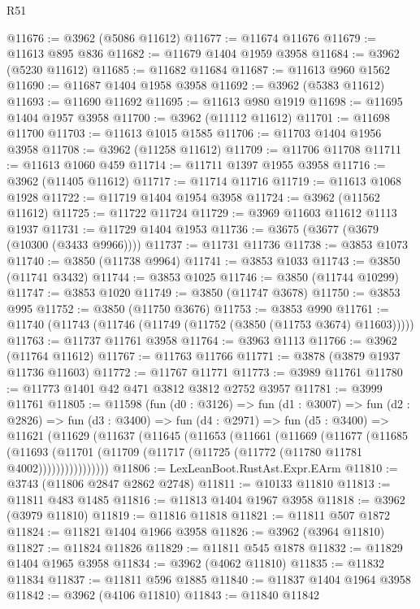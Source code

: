 \begin{lexlean}{R51}
\begin{coremodule}
@11676 := @3962 (@5086 @11612)
@11677 := @11674 @11676
@11679 := @11613 @895 @836
@11682 := @11679 @1404 @1959 @3958
@11684 := @3962 (@5230 @11612)
@11685 := @11682 @11684
@11687 := @11613 @960 @1562
@11690 := @11687 @1404 @1958 @3958
@11692 := @3962 (@5383 @11612)
@11693 := @11690 @11692
@11695 := @11613 @980 @1919
@11698 := @11695 @1404 @1957 @3958
@11700 := @3962 (@11112 @11612)
@11701 := @11698 @11700
@11703 := @11613 @1015 @1585
@11706 := @11703 @1404 @1956 @3958
@11708 := @3962 (@11258 @11612)
@11709 := @11706 @11708
@11711 := @11613 @1060 @459
@11714 := @11711 @1397 @1955 @3958
@11716 := @3962 (@11405 @11612)
@11717 := @11714 @11716
@11719 := @11613 @1068 @1928
@11722 := @11719 @1404 @1954 @3958
@11724 := @3962 (@11562 @11612)
@11725 := @11722 @11724
@11729 := @3969 @11603 @11612 @1113 @1937
@11731 := @11729 @1404 @1953
@11736 := @3675 (@3677 (@3679 (@10300 (@3433 @9966))))
@11737 := @11731 @11736
@11738 := @3853 @1073
@11740 := @3850 (@11738 @9964)
@11741 := @3853 @1033
@11743 := @3850 (@11741 @3432)
@11744 := @3853 @1025
@11746 := @3850 (@11744 @10299)
@11747 := @3853 @1020
@11749 := @3850 (@11747 @3678)
@11750 := @3853 @995
@11752 := @3850 (@11750 @3676)
@11753 := @3853 @990
@11761 := @11740 (@11743 (@11746 (@11749 (@11752 (@3850 (@11753 @3674) @11603)))))
@11763 := @11737 @11761 @3958
@11764 := @3963 @1113
@11766 := @3962 (@11764 @11612)
@11767 := @11763 @11766
@11771 := @3878 (@3879 @1937 @11736 @11603)
@11772 := @11767 @11771
@11773 := @3989 @11761
@11780 := @11773 @1401 @42 @471 @3812 @3812 @2752 @3957
@11781 := @3999 @11761
@11805 := @11598
    (fun (d0 : @3126) =>
    fun (d1 : @3007) =>
    fun (d2 : @2826) =>
    fun (d3 : @3400) =>
    fun (d4 : @2971) =>
    fun (d5 : @3400) =>
    @11621
      (@11629
        (@11637
          (@11645
            (@11653
              (@11661
                (@11669
                  (@11677
                    (@11685
                      (@11693
                        (@11701 (@11709 (@11717 (@11725 (@11772 (@11780 @11781 @4002))))))))))))))))
@11806 := LexLeanBoot.RustAst.Expr.EArm
@11810 := @3743 (@11806 @2847 @2862 @2748)
@11811 := @10133 @11810
@11813 := @11811 @483 @1485
@11816 := @11813 @1404 @1967 @3958
@11818 := @3962 (@3979 @11810)
@11819 := @11816 @11818
@11821 := @11811 @507 @1872
@11824 := @11821 @1404 @1966 @3958
@11826 := @3962 (@3964 @11810)
@11827 := @11824 @11826
@11829 := @11811 @545 @1878
@11832 := @11829 @1404 @1965 @3958
@11834 := @3962 (@4062 @11810)
@11835 := @11832 @11834
@11837 := @11811 @596 @1885
@11840 := @11837 @1404 @1964 @3958
@11842 := @3962 (@4106 @11810)
@11843 := @11840 @11842

\end{coremodule}
\end{lexlean}
